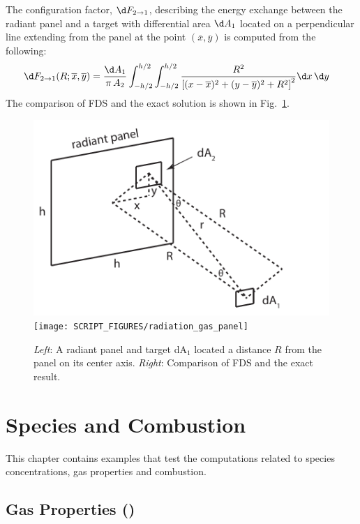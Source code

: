 \documentclass[11pt]{book}
\begin{document}
The configuration factor, $\d F_{2 \rightarrow 1}$, describing the energy exchange between the radiant panel and a target with differential area $\d A_1$ located on a perpendicular line extending from the panel at the point  $(\overline{x}, \overline{y})$ is computed from the following:
\begin{align}
 \d F_{2 \rightarrow 1} (R; \overline{x}, \overline{y})
    &= \frac{\d A_1}{\pi \, A_2}
        \int_{-h/2}^{h/2} \int_{-h/2}^{h/2} \frac{R^2}{\left[ (x-\overline{x})^2 + (y-\overline{y})^2 + R^2 \right]^2} \d x \, \d y
 \label{eq:2->d1 configuration factor - general}
\end{align}
The comparison of FDS and the exact solution is shown in Fig.~\ref{radiation_gas_panel_plot}.

\begin{figure}[ht]
\centering
\includegraphics[height=2.in]{FIGURES/radiation_gas_panel_configuration}
\texttt{[image: SCRIPT\_FIGURES/radiation\_gas\_panel]}
\caption[The  case]{\emph{Left}: A radiant panel and target dA$_1$ located a distance $R$ from the panel on its center axis.  \emph{Right}: Comparison of FDS and the exact result.}
\label{radiation_gas_panel_plot}
\end{figure}



\chapter{Species and Combustion}

This chapter contains examples that test the computations related to species concentrations, gas properties and combustion.

\section{Gas Properties (\texorpdfstring{}{species\_props})}
\label{gas_properties}
\label{species_props}
\end{document}
